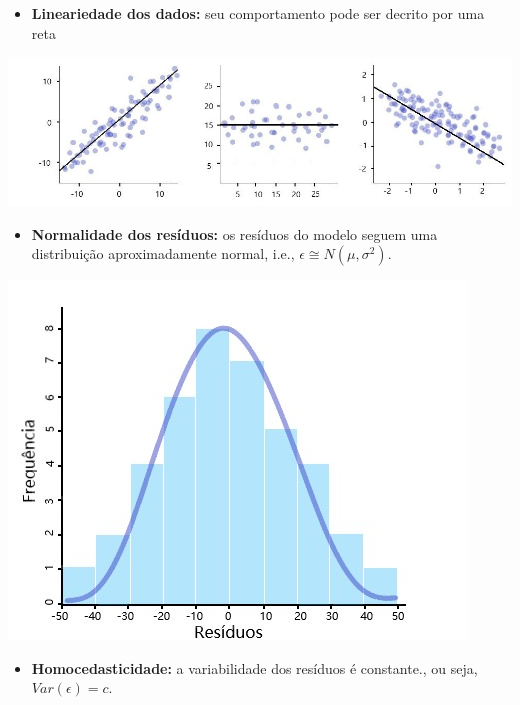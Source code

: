\documentclass[
]{article}
\providecommand{\tightlist}{%
  \setlength{\itemsep}{0pt}\setlength{\parskip}{0pt}}
\begin{document}
\begin{itemize}
\tightlist
\item
  \textbf{Lineariedade dos dados:} seu comportamento pode ser decrito
  por uma reta
\end{itemize}

\includegraphics{images/regressoes.jpg}

\begin{itemize}
\tightlist
\item
  \textbf{Normalidade dos resíduos:} os resíduos do modelo seguem uma
  distribuição aproximadamente normal, i.e.,
  \(\epsilon \cong N(\mu, \sigma^2)\).
\end{itemize}

\includegraphics{images/resinorm.jpg}

\begin{itemize}
\tightlist
\item
  \textbf{Homocedasticidade:} a variabilidade dos resíduos é constante.,
  ou seja, \(Var(\epsilon)=c\).
\end{itemize}
\end{document}
